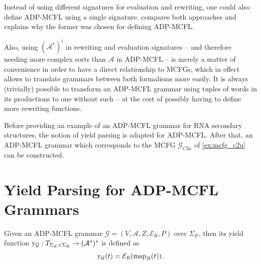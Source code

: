 \documentclass[
    a4paper,
    12pt,
    twoside,
    BCOR=12mm,
    parskip=half,
    chapterprefix,
    numbers=noenddot,
    bibliography=totoc
]{scrbook}
\begin{document}
Instead of using different signatures for evaluation and rewriting, one could also define ADP-MCFL using a single signature.  compares both approaches and explains why the former was chosen for defining ADP-MCFL.

Also, using $(\mathcal{A}^*)^i$ in rewriting and evaluation signatures -- and therefore needing more complex sorts than $\mathcal{A}$ in ADP-MCFL -- is merely a matter of convenience in order to have a direct relationship to \glspl{MCFG}, which in effect allows to translate grammars between both formalisms more easily. It is always (trivially) possible to transform an ADP-MCFL grammar using tuples of words in its productions to one without such -- at the cost of possibly having to define more rewriting functions.

Before providing an example of an ADP-MCFL grammar for RNA secondary structures, the notion of yield parsing is adapted for ADP-MCFL. After that, an ADP-MCFL grammar which corresponds to the \gls{MCFG} $\mathcal{G}_{C2u}$ of \cref{ex:mcfg_c2u} can be constructed.

\section{Yield Parsing for ADP-MCFL Grammars}

Given an ADP-MCFL grammar $\mathcal{G}=(V,\mathcal{A},Z,\mathcal{E}_R,P)$ over $\Sigma_E$, then its yield function $\mathrm{y}_\mathcal{G} : T_{\Sigma_E \times \Sigma_R} \to (\mathcal{A}^*)^*$ is defined as 
\begin{equation}
  \label{eq:ymcfl}
	\mathrm{y}_\mathcal{G}(t) = \mathcal{E}_R (\mathrm{map}_R(t)).
\end{equation}
\end{document}

